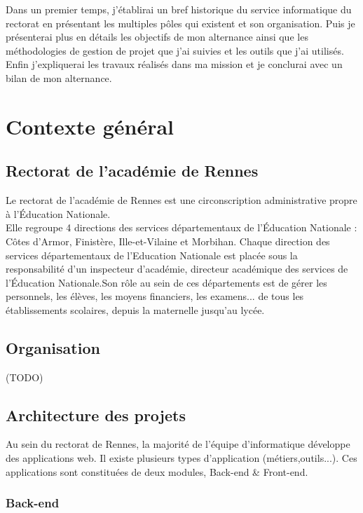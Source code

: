 \documentclass[12pt]{article}
\begin{document}
Dans un premier temps, j'établirai un bref historique du service informatique du rectorat en présentant les multiples pôles qui existent et son organisation. Puis je présenterai plus en détails les objectifs de mon alternance ainsi que les méthodologies de gestion de projet que j'ai suivies et les outils que j'ai utilisés. Enfin j'expliquerai les travaux réalisés dans ma mission et je conclurai avec un bilan de mon alternance.

\newpage




\section{Contexte général}
\subsection{Rectorat de l’académie de Rennes}

Le rectorat de l'académie de Rennes est une circonscription administrative propre à
l’Éducation Nationale.\\
Elle regroupe 4 directions des services départementaux de l'Éducation Nationale :
Côtes d'Armor, Finistère, Ille-et-Vilaine et Morbihan. Chaque direction des services départementaux de l'Education Nationale est placée sous la responsabilité d'un inspecteur d'académie, directeur académique des services de l'Éducation Nationale.Son rôle au sein de ces départements est de gérer les personnels, les élèves, les moyens financiers, les examens... de tous les établissements scolaires, depuis la maternelle jusqu'au lycée.

\subsection{Organisation}

(TODO)
\subsection{Architecture des projets}

Au sein du rectorat de Rennes, la majorité de l'équipe d'informatique  développe des applications web. Il existe plusieurs types d'application (métiers,outils...). Ces applications sont constituées de deux modules, Back-end \&  Front-end.

\subsubsection{Back-end}
\end{document}
